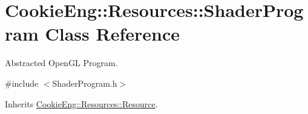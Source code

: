 \hypertarget{class_cookie_eng_1_1_resources_1_1_shader_program}{}\section{Cookie\+Eng\+:\+:Resources\+:\+:Shader\+Program Class Reference}
\label{class_cookie_eng_1_1_resources_1_1_shader_program}


Abstracted Open\+GL Program.  




{\ttfamily \#include $<$Shader\+Program.\+h$>$}



Inherits \hyperlink{class_cookie_eng_1_1_resources_1_1_resource}{Cookie\+Eng\+::\+Resources\+::\+Resource}.

